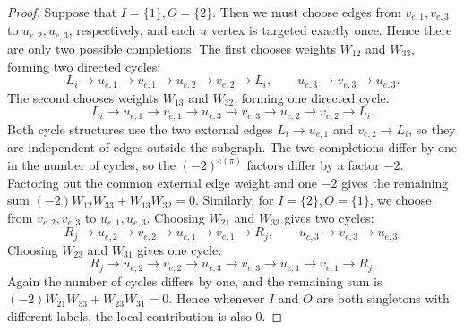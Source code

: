 \documentclass[10pt,a4paper]{amsart}
\begin{document}
\begin{proof}
Suppose that $I=\{1\},O=\{2\}$. Then we must choose edges from $v_{e,1},v_{e,3}$ to $u_{e,2},u_{e,3}$, respectively, and each $u$ vertex is targeted exactly once. Hence there are only two possible completions. The first chooses weights $W_{12}$ and $W_{33}$, forming two directed cycles:
\[
  L_i\to u_{e,1}\to v_{e,1}\to u_{e,2}
  \to v_{e,2}\to L_i,
  \qquad
  u_{e,3}\to v_{e,3}\to u_{e,3}.
\]
The second chooses weights $W_{13}$ and $W_{32}$, forming one directed cycle:
\[
  L_i\to u_{e,1}\to v_{e,1}\to u_{e,3}
  \to v_{e,3}\to u_{e,2}\to v_{e,2}\to L_i.
\]
Both cycle structures use the two external edges $L_i\to u_{e,1}$ and $v_{e,2}\to L_i$, so they are independent of edges outside the subgraph. The two completions differ by one in the number of cycles, so the $(-2)^{c(\pi)}$ factors differ by a factor $-2$. Factoring out the common external edge weight and one $-2$ gives the remaining sum
$(-2)W_{12}W_{33}+W_{13}W_{32}=0$.
Similarly, for $I=\{2\},O=\{1\}$, we choose from $v_{e,2},v_{e,3}$ to $u_{e,1},u_{e,3}$. Choosing $W_{21}$ and $W_{33}$ gives two cycles:
\[
  R_j\to u_{e,2}\to v_{e,2}\to u_{e,1}
  \to v_{e,1}\to R_j,
  \qquad
  u_{e,3}\to v_{e,3}\to u_{e,3}.
\]
Choosing $W_{23}$ and $W_{31}$ gives one cycle:
\[
  R_j\to u_{e,2}\to v_{e,2}\to u_{e,3}
  \to v_{e,3}\to u_{e,1}\to v_{e,1}\to R_j.
\]
Again the number of cycles differs by one, and the remaining sum is
$(-2)W_{21}W_{33}+W_{23}W_{31}=0$.
Hence whenever $I$ and $O$ are both singletons with different labels, the local contribution is also $0$.


\end{proof}
\end{document}
